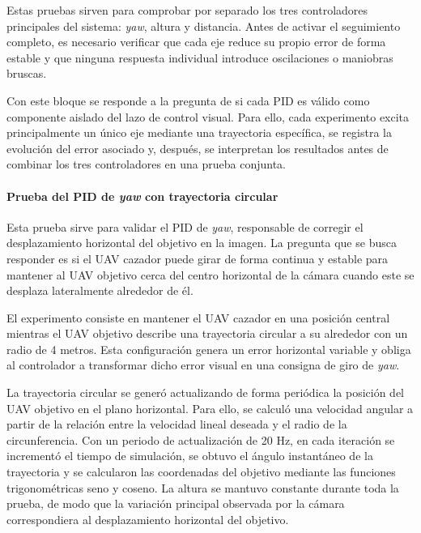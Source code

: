 Estas pruebas sirven para comprobar por separado los tres controladores principales del sistema: \textit{yaw}, altura y distancia. Antes de activar el seguimiento completo, es necesario verificar que cada eje reduce su propio error de forma estable y que ninguna respuesta individual introduce oscilaciones o maniobras bruscas.

\vspace{0.3cm}

Con este bloque se responde a la pregunta de si cada PID es válido como componente aislado del lazo de control visual. Para ello, cada experimento excita principalmente un único eje mediante una trayectoria específica, se registra la evolución del error asociado y, después, se interpretan los resultados antes de combinar los tres controladores en una prueba conjunta.

\paragraph{Prueba del PID de \textit{yaw} con trayectoria circular}\mbox{}\par

Esta prueba sirve para validar el PID de \textit{yaw}, responsable de corregir el desplazamiento horizontal del objetivo en la imagen. La pregunta que se busca responder es si el UAV cazador puede girar de forma continua y estable para mantener al UAV objetivo cerca del centro horizontal de la cámara cuando este se desplaza lateralmente alrededor de él.

\vspace{0.3cm}

El experimento consiste en mantener el UAV cazador en una posición central mientras el UAV objetivo describe una trayectoria circular a su alrededor con un radio de 4 metros. Esta configuración genera un error horizontal variable y obliga al controlador a transformar dicho error visual en una consigna de giro de \textit{yaw}.

\vspace{0.3cm}

La trayectoria circular se generó actualizando de forma periódica la posición del UAV objetivo en el plano horizontal. Para ello, se calculó una velocidad angular a partir de la relación entre la velocidad lineal deseada y el radio de la circunferencia. Con un periodo de actualización de 20 Hz, en cada iteración se incrementó el tiempo de simulación, se obtuvo el ángulo instantáneo de la trayectoria y se calcularon las coordenadas del objetivo mediante las funciones trigonométricas seno y coseno. La altura se mantuvo constante durante toda la prueba, de modo que la variación principal observada por la cámara correspondiera al desplazamiento horizontal del objetivo.

